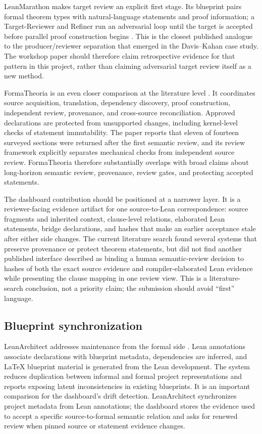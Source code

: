 \documentclass[11pt]{article}
\begin{document}
LeanMarathon makes target review an explicit first stage.  Its blueprint pairs
formal theorem types with natural-language statements and proof information;
a Target-Reviewer and Refiner run an adversarial loop until the target is
accepted before parallel proof construction begins \citep{zhang2026leanmarathon}.
This is the closest published analogue to the producer/reviewer separation that
emerged in the Davis--Kahan case study.  The workshop paper should therefore
claim retrospective evidence for that pattern in this project, rather than
claiming adversarial target review itself as a new method.

FormaTheoria is an even closer comparison at the literature level
\citep{nie2026formatheoria}.  It coordinates source acquisition, translation,
dependency discovery, proof construction, independent review, provenance, and
cross-source reconciliation.  Approved declarations are protected from
unsupported changes, including kernel-level checks of statement immutability.
The paper reports that eleven of fourteen surveyed sections were returned after
the first semantic review, and its review framework explicitly separates
mechanical checks from independent source review.  FormaTheoria therefore
substantially overlaps with broad claims about long-horizon semantic review,
provenance, review gates, and protecting accepted statements.

The dashboard contribution should be positioned at a narrower layer.  It is a
reviewer-facing evidence artifact for one source-to-Lean correspondence: source
fragments and inherited context, clause-level relations, elaborated Lean
statements, bridge declarations, and hashes that make an earlier acceptance
stale after either side changes.  The current literature search found several
systems that preserve provenance or protect theorem statements, but did not
find another published interface described as binding a human semantic-review
decision to hashes of both the exact source evidence and compiler-elaborated
Lean evidence while presenting the clause mapping in one review view.  This is
a literature-search conclusion, not a priority claim; the submission should
avoid ``first'' language.

\subsection{Blueprint synchronization}

LeanArchitect addresses maintenance from the formal side
\citep{zhu2026leanarchitect}.  Lean annotations associate declarations with
blueprint metadata, dependencies are inferred, and LaTeX blueprint material is
generated from the Lean development.  The system reduces duplication between
informal and formal project representations and reports exposing latent
inconsistencies in existing blueprints.  It is an important comparison for the
dashboard's drift detection.  LeanArchitect synchronizes project metadata from
Lean annotations; the dashboard stores the evidence used to accept a specific
source-to-formal semantic relation and asks for renewed review when pinned
source or statement evidence changes.
\end{document}

